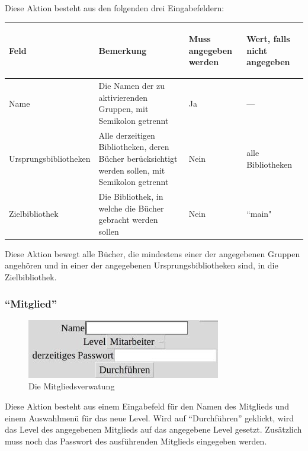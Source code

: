Diese Aktion besteht aus den folgenden drei Eingabefeldern:

\begin{tabular}{|p{}|p{}|p{}|p{}|}\hline
\begin{center}Feld\end{center} & \begin{center}Bemerkung\end{center} & \begin{center}Muss angegeben werden\end{center} & \begin{center}Wert, falls nicht angegeben\end{center}\\
\hline
Name & Die Namen der zu aktivierenden Gruppen, mit Semikolon getrennt & Ja &  ---\\
\hline
Ur\-sprungs\-bib\-li\-othe\-ken & Alle derzeitigen Bibliotheken, deren Bücher berücksichtigt werden sollen, mit Semikolon getrennt & Nein & alle Bibliotheken\\
\hline
Ziel\-bibliothek & Die Bibliothek, in welche die Bücher gebracht werden sollen & Nein & ``main"\\
\hline
\end{tabular}

Diese Aktion bewegt alle Bücher, die mindestens einer der angegebenen Gruppen angehören und in einer der angegebenen Ursprungsbibliotheken sind, in die Zielbibliothek.

\subsubsection{``Mitglied''}
\label{subsubsec:detail:edit:member}
\begin{figure}\includegraphics{images/gui2/edit_member.jpg}\caption{Die Mitgliedsverwatung}\label{fig:edit_member}\end{figure}

Diese Aktion besteht aus einem Eingabefeld für den Namen des Mitglieds und einem Auswahlmenü für das neue Level. Wird auf ``Durchführen'' geklickt, wird das Level des angegebenen Mitglieds auf das angegebene Level gesetzt. Zusätzlich muss noch das Passwort des ausführenden Mitglieds eingegeben werden. \\

